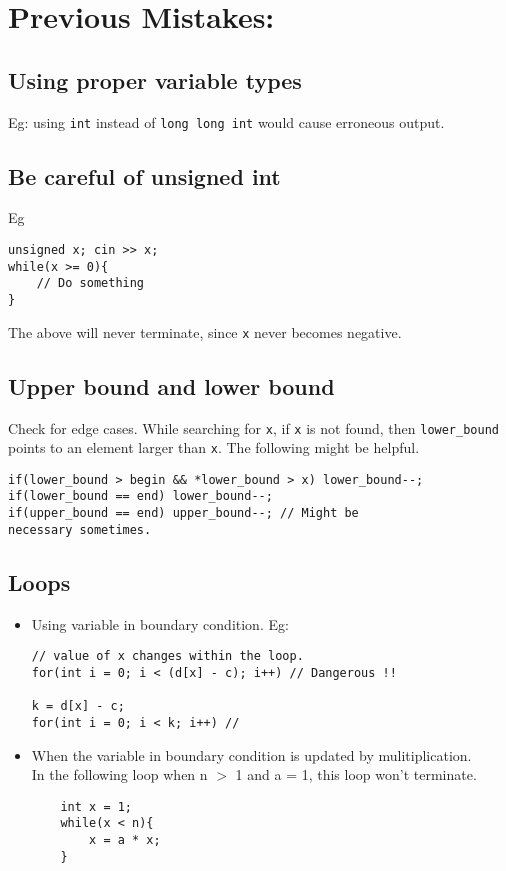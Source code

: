 \section{Previous Mistakes:}

\subsection{Using proper variable types}
Eg: using \texttt{int} instead of \texttt{long long int} would cause erroneous output.\\

\subsection{Be careful of unsigned int}
Eg
\vspace{-6pt}
\begin{verbatim}
unsigned x; cin >> x;
while(x >= 0){
    // Do something
}
\end{verbatim}
The above will never terminate, since \texttt{x} never becomes negative.

\subsection{Upper bound and lower bound}
Check for edge cases. While searching for \texttt{x}, if \texttt{x} is not found, then \texttt{lower\_bound} points to an element larger than \texttt{x}. The following might be helpful.


\begin{verbatim}
if(lower_bound > begin && *lower_bound > x) lower_bound--;
if(lower_bound == end) lower_bound--;
if(upper_bound == end) upper_bound--; // Might be 
necessary sometimes.
\end{verbatim}


\subsection{Loops}
\begin{itemize}
\item  Using variable in boundary condition. Eg:\\
\begin{verbatim}
// value of x changes within the loop. 
for(int i = 0; i < (d[x] - c); i++) // Dangerous !!

k = d[x] - c;
for(int i = 0; i < k; i++) // 
\end{verbatim}

\item When the variable in boundary condition is updated by mulitiplication.\\
In the following loop when n $>$ 1 and a = 1, this loop won't terminate.
\begin{verbatim}
    int x = 1;
    while(x < n){
        x = a * x; 
    }
\end{verbatim}

\end{itemize}

